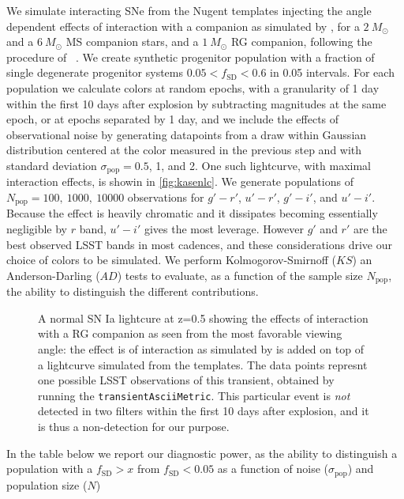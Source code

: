 We simulate interacting SNe from the Nugent templates \citep{Nugent02}
injecting the angle dependent effects of interaction with a companion
as simulated by \citep{Kasen10}, for a $2~M_\odot$ and a $6~M_\odot$
MS companion stars, and a $1~M_\odot$ RG companion, following the
procedure of ~\citep{Bianco11}. We create synthetic progenitor
population with a fraction of single degenerate progenitor systems
$0.05 < f_\mathrm{SD} < 0.6 $ in 0.05 intervals. For each population
we calculate colors at random epochs, with a granularity of 1 day
within the first 10 days after explosion by subtracting magnitudes at
the same epoch, or at epochs separated by 1 day, and we include the
effects of observational noise by generating datapoints from a draw
within Gaussian distribution centered at the color measured in the
previous step and with standard deviation $\sigma_\mathrm{pop} = 0.5$,
1, and 2. One such lightcurve, with maximal interaction effects, is showin in \autoref{fig:kasenlc}.
We generate populations of $N_\mathrm{pop}=100,
~1000,~10000$ observations for $g'-r'$, $u'-r'$, $g'-i'$, and
$u'-i'$. Because the effect is heavily chromatic and it dissipates
becoming essentially negligible by $r$ band, $u'-i'$ gives the most
leverage. However $g'$ and $r'$ are the best observed LSST bands in
most cadences, and these considerations drive our choice of colors to
be simulated. We perform Kolmogorov-Smirnoff ($KS$) an
Anderson-Darling ($AD$) tests to evaluate, as a function of the sample
size $N_\mathrm{pop}$, the ability to distinguish the different
contributions.

\begin{figure}[hbt]
\caption{
A normal SN Ia lightcure at z=0.5 showing the effects of interaction
with a RG companion as seen from the most favorable viewing angle: the
effect is of interaction as simulated by \citet{Kasen10} is added on top
of a lightcurve simulated from the \citealt{Nugent02} templates. The
data points represnt one possible LSST observations of this transient,
obtained by running the \texttt{transientAsciiMetric}. This particular
event is \emph{not} detected in two filters within the first 10 days
after explosion, and it is thus a non-detection for our purpose.}
\label{fig:kasenlc}
\end{figure}



In the table below we report our diagnostic power, as the ability to distinguish a population with a $f_\mathrm{SD} > x$ from $f_\mathrm{SD}<0.05$ as a function of noise ($\sigma_\mathrm{pop}$) and population size ($N$)

